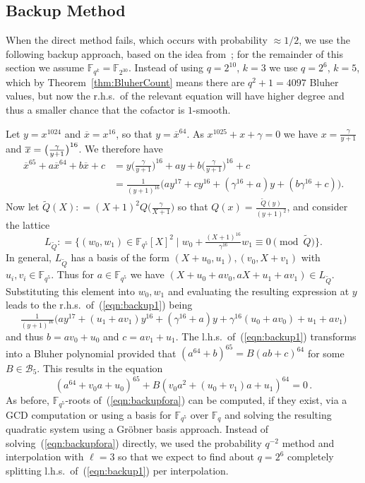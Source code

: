 \documentclass[11pt]{llncs}
\newcommand{\F}{\mathbb F}
\newcommand{\defeq}{\mathrel{\mathop:}=}
\begin{document}
\subsection{Backup Method}

When the direct method fails, which occurs with probability $\approx 1/2$, we use the following backup approach, based on the idea from~\cite{GGMZ13b}; for the remainder of this section we assume $\F_{q^k}=\F_{2^{30}}$.
Instead of using $q = 2^{10}$, $k= 3$ we use $q = 2^6$, $k = 5$, which by Theorem~\ref{thm:BluherCount} means there are $q^2 + 1 = 4097$ Bluher values,
but now the r.h.s.\ of the relevant equation will have higher degree and thus a smaller chance that the cofactor is $1$-smooth.

Let $y = x^{1024}$ and $\overline x = x^{16}$, so that $y = \overline x^{64}$. As $x^{1025} + x + \gamma = 0$ we have $x = \frac {\gamma} {y+1}$
and $\overline x = \smash{\big( \frac{\gamma}{y+1} \big)^{16}}$. We therefore have
\begin{align}\label{eqn:backup1}
  \nonumber \overline x^{65} + a \overline x^{64} + b \overline x + c
  &= y \big( \tfrac {\gamma} {y+1} \big)^{16} + a y + b \big( \tfrac {\gamma} {y+1} \big)^{16} + c \\
  &= \tfrac 1 {(y+1)^{16}} \big( a y^{17} + c y^{16} + (\gamma^{16} + a) y + (b \gamma^{16} + c) \big) .
\end{align}
Now let $\widetilde{Q}(X) \defeq (X+1)^2 Q\big(\frac{\gamma}{X+1}\big)$ so that $Q(x) = \frac{\widetilde{Q}(y)}{(y+1)^2}$, and consider the lattice
\[
L_{\widetilde{Q}} \defeq \big\{ (w_0, w_1) \in \F_{q^5}[X]^2 \mid w_0 + \tfrac {(X+1)^{16}} {\gamma^{16}} w_1 \equiv 0 \!\!\pmod{\widetilde{Q}} \big\}.
\]
In general, $L_{\widetilde{Q}}$ has a basis of the form $(X+u_0,u_1),(v_0,X+v_1)$ with $u_i,v_i \in \F_{q^5}$. Thus for $a \in \F_{q^5}$ we have
$(X + u_0 + av_0,aX +u_1 + av_1) \in L_{\widetilde{Q}}$. Substituting this element into $w_0,w_1$ and evaluating the resulting expression at $y$ 
leads to the r.h.s.\ of~(\ref{eqn:backup1}) being
\[
  \tfrac 1 {(y+1)^{16}} \big( a y^{17} + (u_1 + a v_1) y^{16} + (\gamma^{16} + a) y + \gamma^{16} (u_0 + a v_0) + u_1 + a v_1 \big)
\]
and thus $b = a v_0 + u_0$ and $c = a v_1 + u_1$. The l.h.s.\ of~(\ref{eqn:backup1}) transforms into a Bluher polynomial provided that 
$(a^{64} + b)^{65} = B (a b + c)^{64}$ for some $B \in \mathcal{B}_5$. This results in the equation
\begin{equation}\label{eqn:backupfora}
(a^{64} + v_0 a + u_0)^{65} + B(v_0 a^2 + (u_0 + v_1) a + u_1)^{64} = 0 \,.
\end{equation}
As before, $\F_{q^5}$-roots of~(\ref{eqn:backupfora}) can be computed, if they exist, via a GCD computation or using a basis for $\F_{q^5}$
over $\F_q$ and solving the resulting quadratic system using a Gr\"obner basis approach. 
Instead of solving~(\ref{eqn:backupfora}) directly, we used
the probability $q^{-2}$ method and interpolation with $\ell = 3$ so that
we expect to find about $q = 2^6$ completely splitting l.h.s.\ of~(\ref{eqn:backup1}) per interpolation.
\end{document}
